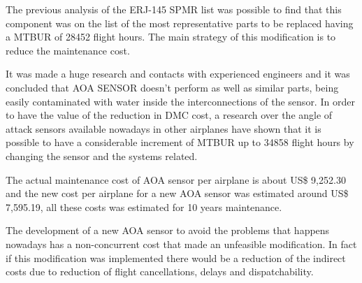 The previous analysis of the ERJ-145 SPMR list was possible to find that this component was on the list of the most representative parts to be replaced having a MTBUR of 28452 flight hours. The main strategy of this modification is to reduce the maintenance cost.

It was made a huge research and contacts with experienced engineers and it was concluded that AOA SENSOR doesn't perform as well as similar parts, being easily contaminated with water inside the interconnections of the sensor. In order to have the value of the reduction in DMC cost, a research over the angle of attack sensors available nowadays in other airplanes have shown that it is possible to have a considerable increment of MTBUR up to 34858 flight hours by changing the sensor and the systems related.

The actual maintenance cost of AOA sensor per airplane is about US\$ 9,252.30 and the new cost per airplane for a new AOA sensor was estimated around US\$ 7,595.19, all these costs was estimated for 10 years maintenance.

The development of a new AOA sensor to avoid the problems that happens nowadays has a non-concurrent cost that made an unfeasible modification.
In fact if this modification was implemented there would be a reduction of the indirect costs due to reduction of flight cancellations, delays and dispatchability.
